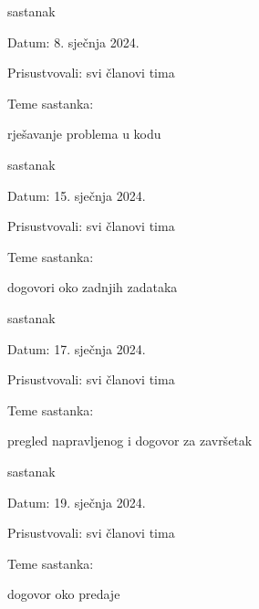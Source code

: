 \begin{packed_enum}
			\item  sastanak
			\item[] \begin{packed_item}
				\item Datum: 8. sječnja 2024.
				\item Prisustvovali: svi članovi tima
				\item Teme sastanka:
				\begin{packed_item}
					\item rješavanje problema u kodu
				\end{packed_item}
			\end{packed_item}
			
			\item  sastanak
			\item[] \begin{packed_item}
				\item Datum: 15. sječnja 2024.
				\item Prisustvovali: svi članovi tima
				\item Teme sastanka:
				\begin{packed_item}
					\item dogovori oko zadnjih zadataka
				\end{packed_item}
			\end{packed_item}
			
			\item  sastanak
			\item[] \begin{packed_item}
				\item Datum: 17. sječnja 2024.
				\item Prisustvovali: svi članovi tima
				\item Teme sastanka:
				\begin{packed_item}
					\item pregled napravljenog i dogovor za završetak
				\end{packed_item}
			\end{packed_item}
			
			\item  sastanak
			\item[] \begin{packed_item}
				\item Datum: 19. sječnja 2024.
				\item Prisustvovali: svi članovi tima
				\item Teme sastanka:
				\begin{packed_item}
					\item dogovor oko predaje
				\end{packed_item}
			\end{packed_item}
			
			
		\end{packed_enum}
		
